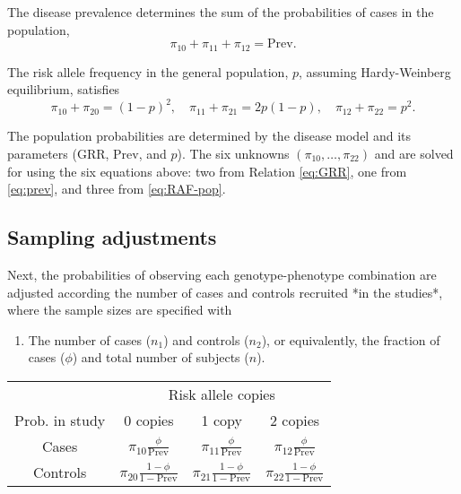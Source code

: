 The disease prevalence determines the sum of the probabilities of cases in the population,
\begin{equation} \label{eq:prev}
    \pi_{10} + \pi_{11} + \pi_{12} = \text{Prev}.
\end{equation}

The risk allele frequency in the general population, $p$, assuming Hardy-Weinberg equilibrium, satisfies 
\begin{equation} \label{eq:RAF-pop}
    \pi_{10} + \pi_{20} = (1-p)^2, \quad \pi_{11} + \pi_{21} = 2p(1-p), \quad \pi_{12} + \pi_{22} = p^2.
\end{equation}

The population probabilities are determined by the disease model and its parameters (GRR, Prev, and $p$).
The six unknowns  $(\pi_{10},\ldots,\pi_{22})$ and are solved for using the six equations above: two from Relation \eqref{eq:GRR}, one from \eqref{eq:prev}, and three from \eqref{eq:RAF-pop}.


\subsection{Sampling adjustments}

Next, the probabilities of observing each genotype-phenotype combination are adjusted according the number of cases and controls recruited *in the studies*, where the sample sizes are specified with

\begin{enumerate}
    \item The number of cases ($n_1$) and controls ($n_2$), or equivalently, the fraction of cases ($\phi$) and total number of subjects ($n$).
\end{enumerate}


\begin{center}
    \begin{tabular}{cccc}
    \hline
    & \multicolumn{3}{c}{Risk allele copies} \\
    \cline{2-4}
    Prob. in study & 0 copies & 1 copy & 2 copies \\
    \hline
    Cases & $\pi_{10}\frac{\phi}{\text{Prev}}$ & $\pi_{11}\frac{\phi}{\text{Prev}}$ & $\pi_{12}\frac{\phi}{\text{Prev}}$ \\
    Controls & $\pi_{20}\frac{1-\phi}{1-\text{Prev}}$ & $\pi_{21}\frac{1-\phi}{1-\text{Prev}}$ & $\pi_{22}\frac{1-\phi}{1-\text{Prev}}$ \\
    \hline
    \end{tabular}
\end{center}


